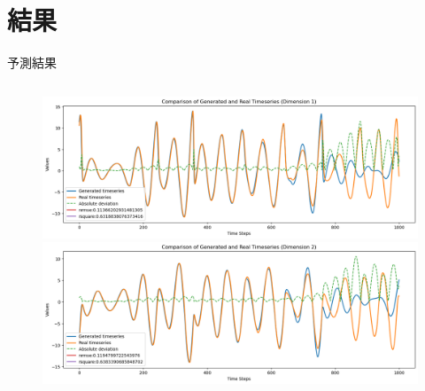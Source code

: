 \section{結果}
\begin{frame}{予測結果}
  \begin{columns}[T] %
    \begin{column}{.5\textwidth}
      \begin{figure}
        \vspace{-.5cm}
        \begin{minipage}[c][.27\textheight][c]{\linewidth}
          \centering
          \includegraphics[width=0.7\linewidth]{Fig/8.x.png}
        \end{minipage}
    
        \vspace{-.5em}

        \begin{minipage}[c][.27\textheight][c]{\linewidth}
          \centering
          \includegraphics[width=0.7\linewidth]{Fig/8.y.png}
        \end{minipage}
        

\end{figure}
\end{column}
\end{columns}
\end{frame}
